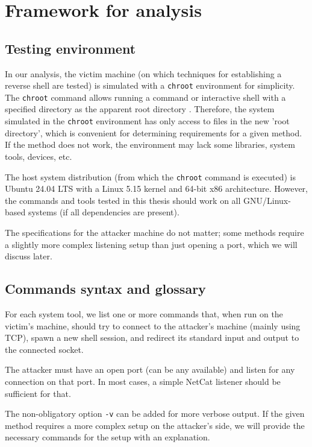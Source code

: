 \chapter{Framework for analysis}
\label{chap:framework}


\section{Testing environment}

In our analysis, the victim machine (on which techniques for establishing a reverse shell are tested) is simulated with a \texttt{chroot} environment for simplicity. The \texttt{chroot} command allows running a command or interactive shell with a specified directory as the apparent root directory \cite{chroot-man}. Therefore, the system simulated in the \texttt{chroot} environment has only access to files in the new 'root directory', which is convenient for determining requirements for a given method. If the method does not work, the environment may lack some libraries, system tools, devices, etc.

The host system distribution (from which the \texttt{chroot} command is executed) is Ubuntu 24.04 LTS with a Linux 5.15 kernel and 64-bit x86 architecture. However, the commands and tools tested in this thesis should work on all GNU/Linux-based systems (if all dependencies are present).

The specifications for the attacker machine do not matter; some methods require a slightly more complex listening setup than just opening a port, which we will discuss later.


\section{Commands syntax and glossary}

For each system tool, we list one or more commands that, when run on the victim's machine, should try to connect to the attacker's machine (mainly using TCP), spawn a new shell session, and redirect its standard input and output to the connected socket.

The attacker must have an open port (can be any available) and listen for any connection on that port. In most cases, a simple NetCat listener should be sufficient for that.


The non-obligatory option \texttt{-v} can be added for more verbose output. If the given method requires a more complex setup on the attacker's side, we will provide the necessary commands for the setup with an explanation.

